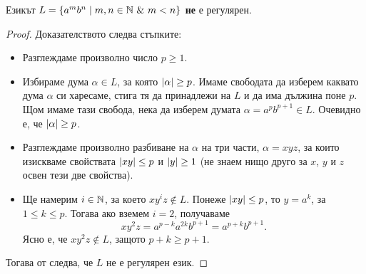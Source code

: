 \begin{example}
  Езикът $L = \{a^mb^n \mid m,n\in \Nat\ \&\ m < n\}$ {\bf не} е регулярен.
\end{example}
\begin{proof}
  Доказателството следва стъпките:
  \begin{itemize}
  \item 
    Разглеждаме произволно число $p \geq 1$.
  \item
    Избираме дума $\alpha \in L$, за която $\lvert{\alpha}\rvert \geq p$. Имаме свободата да изберем каквато дума $\alpha$
    си харесаме, стига тя да принадлежи на $L$ и да има дължина поне $p$.
    Щом имаме тази свобода, нека да изберем думата $\alpha = a^{p}b^{p+1} \in L$. Очевидно е, че $\lvert{\alpha}\rvert \geq p$.
  \item
    Разглеждаме произволно разбиване на $\alpha$ на три части, $\alpha = xyz$,
    за които изискваме свойствата $\lvert{xy}\rvert \leq p$ и $\lvert{y}\rvert \geq 1$ (не знаем нищо друго за $x$, $y$ и $z$ освен тези две свойства).
  \item
    Ще намерим $i\in\mathbb{N}$, за което $xy^iz \not\in L$.
    Понеже $\lvert{xy}\rvert \leq p$, то $y = a^k$, за  $1\leq k \leq p$.
    Тогава ако вземем $i = 2$, получаваме 
    \[xy^2z = a^{p-k}a^{2k}b^{p+1} = a^{p+k}b^{p+1}.\]
    Ясно е, че $xy^2z \not\in L$, защото $p+k \geq p+1$.
  \end{itemize}
  Тогава от  следва, че $L$ не е регулярен език.
\end{proof}


